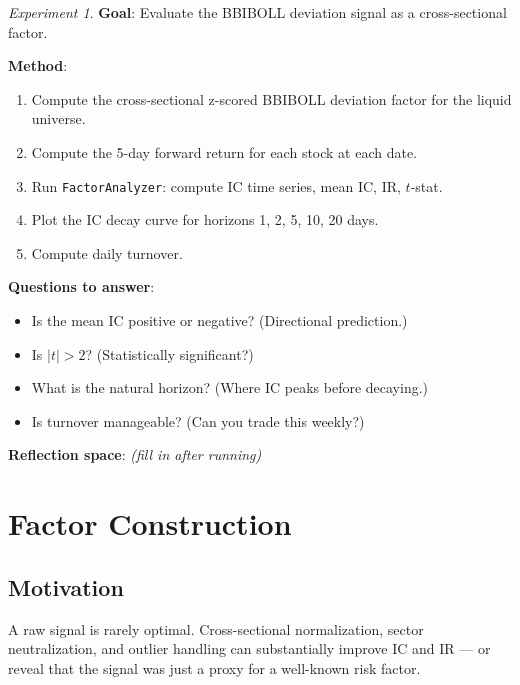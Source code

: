 \documentclass[a4paper, 11pt]{report}
\theoremstyle{definition}
\theoremstyle{remark}
\newtheorem{experiment}{Experiment}[chapter]
\begin{document}
\begin{experiment}
    \textbf{Goal}: Evaluate the BBIBOLL deviation signal as a cross-sectional
    factor.

    \textbf{Method}:
    \begin{enumerate}
        \item Compute the cross-sectional z-scored BBIBOLL deviation factor for
              the liquid universe.
        \item Compute the 5-day forward return for each stock at each date.
        \item Run \texttt{FactorAnalyzer}: compute IC time series, mean IC, IR,
              $t$-stat.
        \item Plot the IC decay curve for horizons 1, 2, 5, 10, 20 days.
        \item Compute daily turnover.
    \end{enumerate}

    \textbf{Questions to answer}:
    \begin{itemize}
        \item Is the mean IC positive or negative?  (Directional prediction.)
        \item Is $|t| > 2$?  (Statistically significant?)
        \item What is the natural horizon?  (Where IC peaks before decaying.)
        \item Is turnover manageable?  (Can you trade this weekly?)
    \end{itemize}

    \textbf{Reflection space}: \emph{(fill in after running)}
\end{experiment}


\chapter{Factor Construction}
\label{ch:factor-construction}

\section{Motivation}

A raw signal is rarely optimal.  Cross-sectional normalization, sector
neutralization, and outlier handling can substantially improve IC and IR ---
or reveal that the signal was just a proxy for a well-known risk factor.
\end{document}
